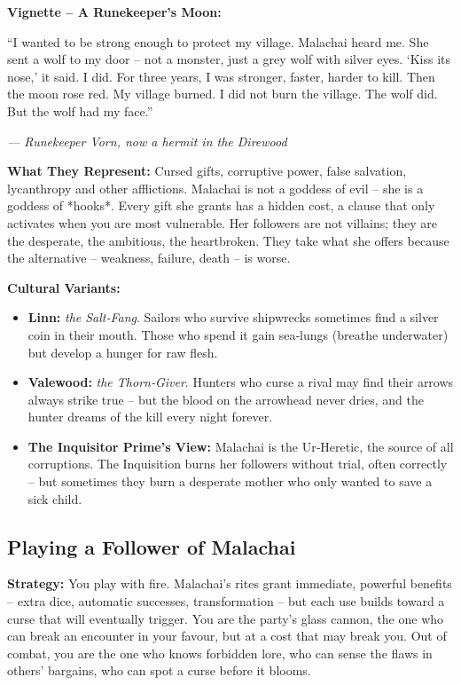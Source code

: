 \documentclass[10pt,a5paper]{book}
\begin{document}
\textbf{Vignette – A Runekeeper’s Moon:}
\epigraph{“I wanted to be strong enough to protect my village. Malachai heard me. She sent a wolf to my door – not a monster, just a grey wolf with silver eyes. ‘Kiss its nose,’ it said. I did. For three years, I was stronger, faster, harder to kill. Then the moon rose red. My village burned. I did not burn the village. The wolf did. But the wolf had my face.”}{\textit{— Runekeeper Vorn, now a hermit in the Direwood}}

\textbf{What They Represent:} Cursed gifts, corruptive power, false salvation, lycanthropy and other afflictions. Malachai is not a goddess of evil – she is a goddess of *hooks*. Every gift she grants has a hidden cost, a clause that only activates when you are most vulnerable. Her followers are not villains; they are the desperate, the ambitious, the heartbroken. They take what she offers because the alternative – weakness, failure, death – is worse.

\textbf{Cultural Variants:}
\begin{itemize}
    \item \textbf{Linn:} \textit{the Salt‑Fang}. Sailors who survive shipwrecks sometimes find a silver coin in their mouth. Those who spend it gain sea‑lungs (breathe underwater) but develop a hunger for raw flesh.
    \item \textbf{Valewood:} \textit{the Thorn‑Giver}. Hunters who curse a rival may find their arrows always strike true – but the blood on the arrowhead never dries, and the hunter dreams of the kill every night forever.
    \item \textbf{The Inquisitor Prime’s View:} Malachai is the Ur‑Heretic, the source of all corruptions. The Inquisition burns her followers without trial, often correctly – but sometimes they burn a desperate mother who only wanted to save a sick child.
\end{itemize}

\subsection*{Playing a Follower of Malachai}

\textbf{Strategy:} You play with fire. Malachai’s rites grant immediate, powerful benefits – extra dice, automatic successes, transformation – but each use builds toward a curse that will eventually trigger. You are the party’s glass cannon, the one who can break an encounter in your favour, but at a cost that may break you. Out of combat, you are the one who knows forbidden lore, who can sense the flaws in others’ bargains, who can spot a curse before it blooms.
\end{document}
